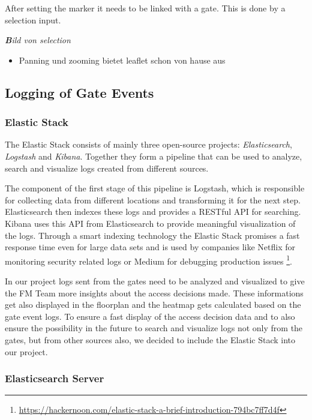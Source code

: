 After setting the marker it needs to be linked with a gate. This is done by a selection input.

\emph{\textbf Bild von selection}

\begin{itemize}
\item Panning und zooming bietet leaflet schon von hause aus
\end{itemize}

\subsection{Logging of Gate Events}
\label{Logging of Gate Events}

\subsubsection{Elastic Stack}
\label{Elastic Stack}

The Elastic Stack consists of mainly three open-source projects: \emph{Elasticsearch}, \emph{Logstash} and \emph{Kibana}.
Together they form a pipeline that can be used to analyze, search and visualize logs created from different sources. 

The component of the first stage of this pipeline is Logstash, which is responsible for collecting data from different locations and transforming it for the next step. Elasticsearch then indexes these logs and provides a RESTful API for searching. Kibana uses this API from Elasticsearch to provide meaningful visualization of the logs.
Through a smart indexing technology the Elastic Stack promises a fast response time even for large data sets and is used by companies like Netflix for monitoring security related logs or Medium for debugging production issues \footnote{\url{https://hackernoon.com/elastic-stack-a-brief-introduction-794bc7ff7d4f}}.

In our project logs sent from the gates need to be analyzed and visualized to give the FM Team more insights about the access decisions made. These informations get also displayed in the floorplan and the heatmap gets calculated based on the gate event logs. To ensure a fast display of the access decision data and to also ensure the possibility in the future to search and visualize logs not only from the gates, but from other sources also, we decided to include the Elastic Stack into our project.

\subsubsection{Elasticsearch Server}


